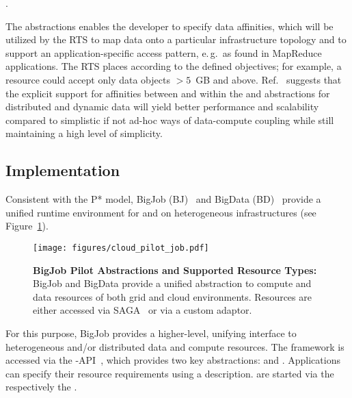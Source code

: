 \documentclass{sig-alternate}
\begin{document}
.


The abstractions enables the
developer to specify data affinities, which will be utilized by the RTS to
map data onto a particular infrastructure topology and to support an
application-specific access pattern, e.\,g.\ as found in MapReduce
applications. The RTS places \dataunits according to the defined
objectives; for example, a resource could accept only data objects
$>5$~GB and above.  Ref.~\cite{ddia_ptrsa10} suggests that the
explicit support for affinities between and within the \pj and \pd
abstractions for distributed and dynamic data will yield better
performance and scalability compared to simplistic if not ad-hoc ways
of data-compute coupling while still maintaining a high level of
simplicity.


\subsection{Implementation}

Consistent with the P* model, BigJob
(BJ)~\cite{saga_bigjob_condor_cloud} and BigData
(BD)~\cite{Mantha:2012:PEF:2287016.2287020} provide a unified runtime
environment for \pilotcomputes and \pilotdata on heterogeneous
infrastructures (see Figure~\ref{fig:figures_cloud_pilot_job}). 
\begin{figure}[t]
	\centering
        \texttt{[image: figures/cloud\_pilot\_job.pdf]}
                \caption{\textbf{BigJob Pilot Abstractions and
                    Supported Resource Types:} BigJob and BigData
                  provide a unified abstraction to compute and data
                  resources of both grid and cloud
                  environments. Resources are either accessed via
                  SAGA~\cite{ogf-gfd-90,saga-bliss-pd} or via a custom
                  adaptor.}
	\label{fig:figures_cloud_pilot_job}
\end{figure}

For this purpose, BigJob provides a higher-level, unifying interface
to heterogeneous and/or distributed data and compute resources. The
framework is accessed via the \pilot-API~\cite{pilot_api}, which
provides two key abstractions: \pilotjob and \pilotdata. Applications
can specify their resource requirements using a \pilot
description. \pilots are started via the \pilotcomputeservice
respectively the \pilotdataservice.
\end{document}
